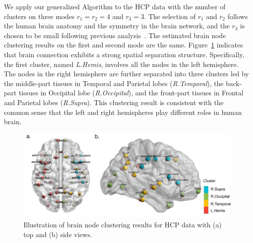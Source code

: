 \documentclass[lettersize,onecolumn,journal]{IEEEtran}
\theoremstyle{definition}
\theoremstyle{definition}
\begin{document}
We apply our generalized Algorithm to the HCP data with the number of clusters on three modes $r_1 = r_2 = 4$ and $r_3 = 3$. The selection of $r_1$ and $r_2$ follows the human brain anatomy and the symmetry in the brain network, and the $r_3$ is chosen to be small following previous analysis~\citep{hu2021generalized}. The estimated brain node clustering results on the first and second mode are the same. Figure~\ref{fig:cluster_brain} indicates that brain connection exhibits a strong spatial separation structure. Specifically, the first cluster, named \emph{L.Hemis}, involves all the nodes in the left hemisphere. The nodes in the right hemisphere are further separated into three clusters led by the middle-part tissues in Temporal and Parietal lobes (\emph{R.Temporal}), the back-part tissues in Occipital lobe (\emph{R.Occipital}), and the front-part tissues in Frontal and Parietal lobes (\emph{R.Supra}). This clustering result is consistent with the common sense that the left and right hemispheres play different roles in human brain. 


\begin{figure}[htb]
    \centering
    \includegraphics[width = .8\columnwidth]{brain_node_cluster.pdf}
    \caption{Illustration of brain node clustering results for HCP data with (a) top and (b) side views. }
    \label{fig:cluster_brain}
\end{figure}
\end{document}
